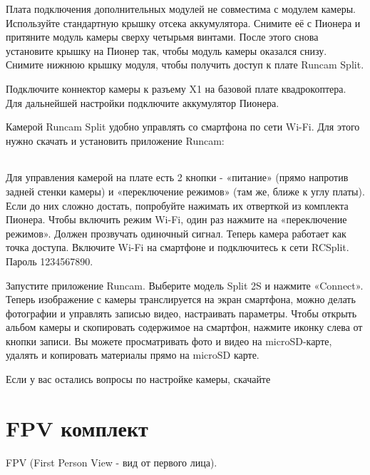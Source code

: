 \documentclass[a4paper,10pt,russian]{sphinxmanual}
\begin{document}
Плата подключения дополнительных модулей не совместима с модулем камеры. Используйте стандартную крышку отсека аккумулятора. Снимите её с Пионера и притяните модуль камеры сверху четырьмя винтами. После этого снова установите крышку на Пионер так, чтобы модуль камеры оказался снизу. Снимите нижнюю крышку модуля, чтобы получить доступ к плате Runcam Split.

Подключите коннектор камеры к разъему X1 на базовой плате квадрокоптера. Для дальнейшей настройки подключите аккумулятор Пионера.

Камерой Runcam Split удобно управлять со смартфона по сети Wi-Fi. Для этого нужно скачать и установить приложение Runcam:


\begin{savenotes}\sphinxattablestart
\centering
\begin{tabulary}{\linewidth}[t]{|T|T|}
\hline

&
\\
\hline
\end{tabulary}
\par
\sphinxattableend\end{savenotes}

Для управления камерой на плате есть 2 кнопки - «питание» (прямо напротив задней стенки камеры) и «переключение режимов» (там же, ближе к углу платы). Если до них сложно достать, попробуйте нажимать их отверткой из комплекта Пионера. Чтобы включить режим Wi-Fi, один раз нажмите на «переключение режимов». Должен прозвучать одиночный сигнал. Теперь камера работает как точка доступа. Включите Wi-Fi на смартфоне и подключитесь к сети RCSplit. Пароль 1234567890.

Запустите приложение Runcam. Выберите модель Split 2S и нажмите «Connect». Теперь изображение с камеры транслируется на экран смартфона, можно делать фотографии и управлять записью видео, настраивать параметры. Чтобы открыть альбом камеры и скопировать содержимое на смартфон, нажмите иконку слева от кнопки записи. Вы можете просматривать фото и видео на microSD-карте, удалять и копировать материалы прямо на microSD карте.

Если у вас остались вопросы по настройке камеры, скачайте 


\section{FPV комплект}
\label{\detokenize{module/fpv:fpv}}\label{\detokenize{module/fpv::doc}}
FPV (First Person View - вид от первого лица).
\end{document}
